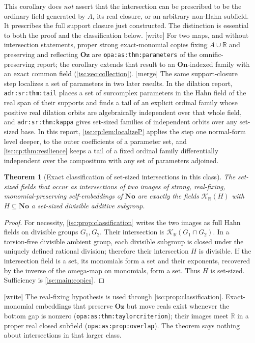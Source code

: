 \documentclass[11pt,letterpaper]{article}
\newtheorem{theorem}{Theorem}[section]
\theoremstyle{definition}
\theoremstyle{remark}
\newcommand{\No}{\mathbf{No}}
\newcommand{\Oz}{\mathbf{Oz}}
\newcommand{\On}{\mathbf{On}}
\newcommand{\R}{\mathbb R}
\newcommand{\K}[2]{\mathcal K_{#1}(#2)}
\newcommand{\lbl}[1]{\nolinkurl{#1}}%
\newcommand{\wtag}{\textup{[write]}}%
\newcommand{\mtag}{\textup{[merge]}}%
\numberwithin{equation}{section}
\begin{document}
This corollary does \emph{not} assert that the intersection can be prescribed
to be the ordinary field generated by $A$, its real closure, or an arbitrary
non-Hahn subfield. It prescribes the full support closure just constructed.
The distinction is essential to both the proof and the classification below.
\wtag{} For two maps, and without intersection statements, proper strong
exact-monomial copies fixing $A\cup\R$ and preserving and reflecting $\Oz$
are \lbl{opa:as:thm:parameters} of the omnific-preserving report; the
corollary extends that result to an $\On$-indexed family with an exact
common field (\cref{isc:sec:collection}).
\mtag{} The same support-closure step localizes a set of parameters in two
later results. In the dilation report, \lbl{adr:sr:thm:tail} places a set of
surcomplex parameters in the Hahn field of the real span of their supports
and finds a tail of an explicit ordinal family whose positive real dilation
orbits are algebraically independent over that whole field, and
\lbl{adr:sr:thm:kappa} gives set-sized families of independent orbits over
any set-sized base. In this report, \cref{isc:cp:lem:localizeP} applies the
step one normal-form level deeper, to the outer coefficients of a parameter
set, and \cref{isc:cp:thm:resilience} keeps a tail of a fixed ordinal family
differentially independent over the compositum with any set of parameters
adjoined.

\begin{theorem}[Exact classification of set-sized intersections in this class]
\label{isc:thm:intersectionclassification}
The set-sized fields that occur as intersections of two images of
strong, real-fixing, monomial-preserving self-embeddings of $\No$ are
exactly the fields $\K{\R}{H}$ with $H\subseteq\No$ a set-sized divisible
additive subgroup.
\end{theorem}
\begin{proof}
For necessity, \cref{isc:prop:classification} writes the two images as full
Hahn fields on divisible groups $G_1,G_2$. Their intersection is
$\K{\R}{G_1\cap G_2}$. In a torsion-free divisible ambient group, each
divisible subgroup is closed under the uniquely defined rational division;
therefore their intersection $H$ is divisible. If the intersection field
is a set, its monomials form a set and their exponents, recovered by the
inverse of the omega-map on monomials, form a set. Thus $H$ is set-sized.
Sufficiency is \cref{isc:main:copies}.
\end{proof}

\wtag{} The real-fixing hypothesis is used through
\cref{isc:prop:classification}. Exact-monomial embeddings that preserve
$\Oz$ but move reals exist whenever the bottom gap is nonzero
(\lbl{opa:as:thm:taylorcriterion}); their images meet $\R$ in a proper
real closed subfield (\lbl{opa:as:prop:overlap}). The theorem says nothing
about intersections in that larger class.
\end{document}
